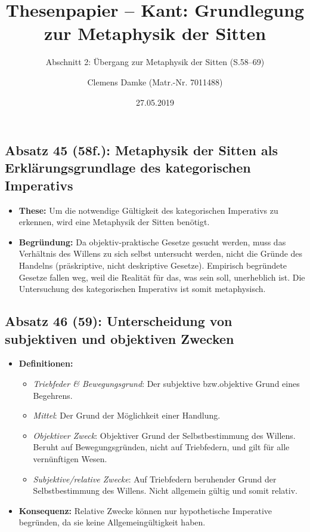 \documentclass{llncs}
\begin{document}
\pagestyle{plain}

\title{Thesenpapier – Kant: Grundlegung zur Metaphysik der Sitten}
\subtitle{Abschnitt 2: Übergang zur Metaphysik der Sitten (S.\@ 58--69)}
\author{Clemens Damke (Matr.-Nr. 7011488)}
\date{27.05.2019}
\maketitle

\subsection*{Absatz 45 (58f.): Metaphysik der Sitten als Erklärungsgrundlage des kategorischen Imperativs}

\begin{itemize}
    \item \textbf{These:} Um die notwendige Gültigkeit des kategorischen Imperativs zu erkennen, wird eine Metaphysik der Sitten benötigt.
    \item \textbf{Begründung:} Da objektiv-praktische Gesetze gesucht werden, muss das Verhältnis des Willens zu sich selbst untersucht werden, nicht die Gründe des Handelns (präskriptive, nicht deskriptive Gesetze).
		Empirisch begründete Gesetze fallen weg, weil die Realität für das, was sein soll, unerheblich ist. Die Untersuchung des kategorischen Imperativs ist somit meta\-physisch.
\end{itemize}

\subsection*{Absatz 46 (59): Unterscheidung von subjektiven und objektiven Zwecken}

\begin{itemize}
    \item \textbf{Definitionen:}
		\begin{itemize}
			\item \textit{Triebfeder \& Bewegungsgrund}: Der subjektive bzw.\@ objektive Grund eines Begehrens.
			\item \textit{Mittel}: Der Grund der Möglichkeit einer Handlung.
			\item \textit{Objektiver Zweck}: Objektiver Grund der Selbstbestimmung des Willens. Beruht auf Bewegungsgründen, nicht auf Triebfedern, und gilt für alle vernünftigen Wesen.
			\item \textit{Subjektive/relative Zwecke}: Auf Triebfedern beruhender Grund der Selbstbestimmung des Willens. Nicht allgemein gültig und somit relativ.
		\end{itemize}
    \item \textbf{Konsequenz:} Relative Zwecke können nur hypothetische Imperative begründen, da sie keine Allgemein\-gültigkeit haben.
\end{itemize}
\end{document}
